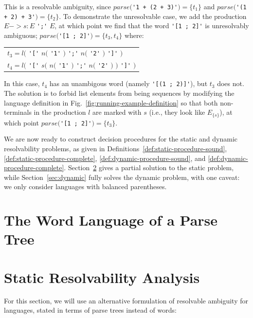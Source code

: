 \documentclass[runningheads]{llncs}
\newcommand{\parse}{\mathit{parse}} %
\begin{document}
\noindent This is a resolvable ambiguity, since $\parse($\verb|'1 + (2 + 3)'|$) = \{t_1\}$ and $\parse($\verb|'(1 + 2) + 3'|$) = \{t_2\}$. To demonstrate the unresolvable case, we add the production $E -> s: E$ \verb|';'| $E$, at which point we find that the word \verb|'[1 ; 2]'| is unresolvably ambiguous; $\parse($\verb|'[1 ; 2]'|$) = \{t_3, t_4\}$ where:

\begin{center}
  \begin{tabular}{l}
    $t_3 = l($ \verb|'['| \hphantom{$s($} $n($ \verb|'1'| $)$ \verb|';'| $n($ \verb|'2'| $)$ \hphantom{$)$} \verb|']'| $)$ \\
    $t_4 = l($ \verb|'['| $s($ $n($ \verb|'1'| $)$ \verb|';'| $n($ \verb|'2'| $)$ $)$ \verb|']'| $)$ \\
  \end{tabular}
\end{center}

\noindent In this case, $t_4$ has an unambigous word (namely \verb|'[(1 ; 2)]'|), but $t_3$ does not. The solution is to forbid list elements from being sequences by modifying the language definition in Fig.~\ref{fig:running-example-definition} so that both non-terminals in the production $l$ are marked with $s$ (i.e., they look like $E_{\{s\}}$), at which point $\parse($\verb|'[1 ; 2]'|$) = \{t_3\}$.

We are now ready to construct decision procedures for the static and dynamic resolvability problems, as given in Definitions~\ref{def:static-procedure-sound}, \ref{def:static-procedure-complete}, \ref{def:dynamic-procedure-sound}, and \ref{def:dynamic-procedure-complete}. Section~\ref{sec:static} gives a partial solution to the static problem, while Section~\ref{sec:dynamic} fully solves the dynamic problem, with one caveat: we only consider languages with balanced parentheses.

\section{The Word Language of a Parse Tree} \label{sec:linear-encoding}

\section{Static Resolvability Analysis} \label{sec:static}

For this section, we will use an alternative formulation of resolvable ambiguity for languages, stated in terms of parse trees instead of words:
\end{document}
